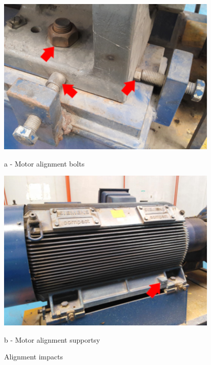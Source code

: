 \begin{figure}[!htb]
	\begin{minipage}[b]{0.5\linewidth}
		\centering
		\includegraphics[width=\textwidth]{figures/ch04_fig_visual06}
		\caption*{a - Motor alignment bolts}
	\end{minipage}
	\hspace{0.05cm}
	\begin{minipage}[b]{0.5\linewidth}
		\centering
		\includegraphics[width=\textwidth]{figures/ch04_fig_visual07}
		\caption*{b - Motor alignment supportsy}
	\end{minipage}
	\caption{Alignment impacts}
	\label{ch04_fig_visual3}
\end{figure}


